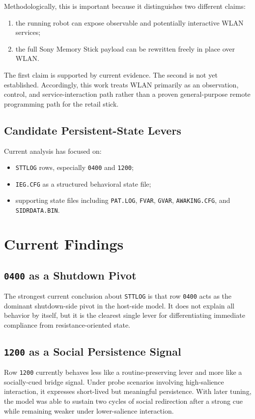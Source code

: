 Methodologically, this is important because it distinguishes two different
claims:
\begin{enumerate}[leftmargin=*]
\item the running robot can expose observable and potentially interactive WLAN
services;
\item the full Sony Memory Stick payload can be rewritten freely in place over
WLAN.
\end{enumerate}

The first claim is supported by current evidence. The second is not yet
established. Accordingly, this work treats WLAN primarily as an observation,
control, and service-interaction path rather than a proven general-purpose
remote programming path for the retail stick.

\subsection{Candidate Persistent-State Levers}
Current analysis has focused on:
\begin{itemize}[leftmargin=*]
\item \texttt{STTLOG} rows, especially \texttt{0400} and \texttt{1200};
\item \texttt{IEG.CFG} as a structured behavioral state file;
\item supporting state files including \texttt{PAT.LOG}, \texttt{FVAR},
\texttt{GVAR}, \texttt{AWAKING.CFG}, and \texttt{SIDRDATA.BIN}.
\end{itemize}

\section{Current Findings}
\subsection{\texttt{0400} as a Shutdown Pivot}
The strongest current conclusion about \texttt{STTLOG} is that row
\texttt{0400} acts as the dominant shutdown-side pivot in the host-side model.
It does not explain all behavior by itself, but it is the clearest single
lever for differentiating immediate compliance from resistance-oriented state.

\subsection{\texttt{1200} as a Social Persistence Signal}
Row \texttt{1200} currently behaves less like a routine-preserving lever and
more like a socially-cued bridge signal. Under probe scenarios involving
high-salience interaction, it expresses short-lived but meaningful persistence.
With later tuning, the model was able to sustain two cycles of social
redirection after a strong cue while remaining weaker under lower-salience
interaction.

